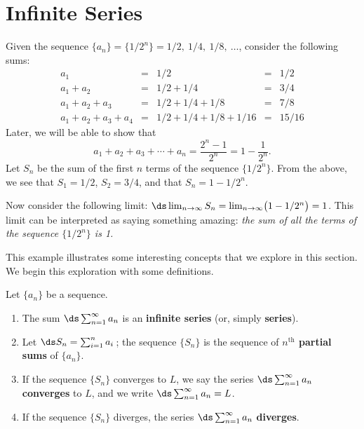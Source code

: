 \section{Infinite Series}\label{sec:series}

Given the sequence $\{a_n\} = \{1/2^n\} = 1/2,\ 1/4,\ 1/8,\ \dotsc$, consider the following sums:\vspace{-.5\baselineskip}
\[
\begin{array}{ccccc}
a_1				&=& 1/2					&=& 1/2\\
a_1+a_2			&=& 1/2+1/4				&=& 3/4\\
a_1+a_2+a_3		&=& 1/2+1/4+1/8			&=& 7/8\\
a_1+a_2+a_3+a_4	&=& 1/2+1/4+1/8+1/16		&=& 15/16
\end{array}
\]
Later, we will be able to show that\vspace{-.5\baselineskip}
\[a_1+a_2+a_3+\dotsb+a_n = \frac{2^n-1}{2^n} = 1-\frac{1}{2^n}.\]
Let $S_n$ be the sum of the first $n$ terms of the sequence $\{1/2^n\}$. From the above, we see that $S_1=1/2$, $S_2 = 3/4$, and that $S_n = 1-1/2^n$. 

Now consider the following limit: $\ds \lim_{n\to\infty}S_n = \lim_{n\to\infty}\bigl(1-1/2^n\bigr) = 1$. This limit can be interpreted as saying something amazing: \emph{the sum of \emph{all} the terms of the sequence $\{1/2^n\}$ is 1.} 


This example illustrates some interesting concepts that we explore in this section. We begin this exploration with some definitions.

{
\begin{definition}\label{def:series}
Let $\{a_n\}$ be a sequence.
\begin{enumerate}
\item		The sum $\ds \sum_{n=1}^\infty a_n$ is an \textbf{infinite series} (or, simply \textbf{series}).
\item		Let $\ds S_n = \sum_{i=1}^n a_i$\,; the sequence $\{S_n\}$ is the sequence of \textbf{$n^\text{th}$ partial sums} of $\{a_n\}$.\vspace{-.5\baselineskip}
\item		If the sequence $\{S_n\}$ converges to $L$, we say the series $\ds \sum_{n=1}^\infty a_n$ \textbf{converges} to $L$, and we write $\ds \sum_{n=1}^\infty a_n = L$.\vspace{-.5\baselineskip}
\item		If the sequence $\{S_n\}$ diverges, the series $\ds \sum_{n=1}^\infty a_n$ \textbf{diverges}.
\end{enumerate}
\end{definition}
}

